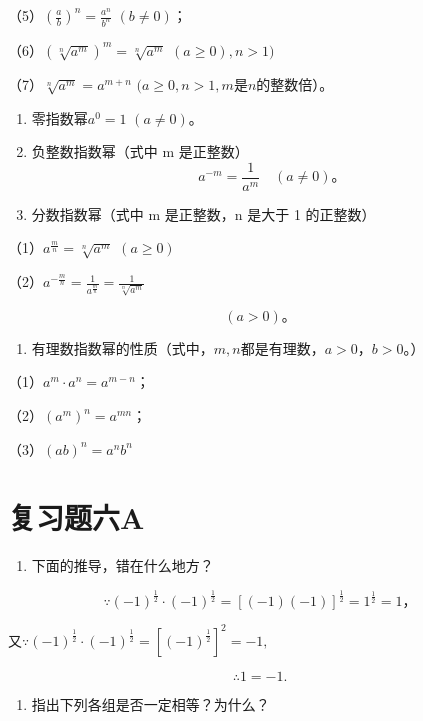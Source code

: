 （5）\(\left(\frac{a}{b}\right)^n = \frac{a^n}{b^n}\) \((b \neq 0)\)；

（6）\((\sqrt[n]{a^m})^m = \sqrt[n]{a^m}\) \((a\geqslant 0),n > 1)\)

（7）\(\sqrt[n]{a^m} = a^{m + n}\) \((a\geqslant 0,n > 1,m\)是\(n\)的整数倍）。

\begin{enumerate}[start=2]
\item
  零指数幂\(a^0 = 1\) \((a \neq 0)\)。
\item
  负整数指数幂（式中 m 是正整数）
\[
a ^ {- m} = \frac{1}{a ^ {m}} \quad (a \neq 0)\text{。}
\]
\item
  分数指数幂（式中 m 是正整数，n 是大于 1 的正整数）
\end{enumerate}

（1）\(a^{\frac{m}{n}} = \sqrt[n]{a^m}\) \((a\geqslant 0)\)

（2）\(a^{-\frac{m}{n}} = \frac{1}{a^{\frac{m}{n}}} = \frac{1}{\sqrt[n]{a^m}}\)

\[
(a > 0)\text{。}
\]

\begin{enumerate}[start=5]
\item
  有理数指数幂的性质（式中，\(m, n\)都是有理数，\(a > 0\)，\(b > 0\)。）
\end{enumerate}

（1）\(a^{m} \cdot a^{n} = a^{m - n}\)；

（2）\((a^{m})^{n} = a^{mn}\)；

（3）\((ab)^{n} = a^{n}b^{n}\)

\section{复习题六A}

\begin{enumerate}
\item
  下面的推导，错在什么地方？
\end{enumerate}

\[
\because (- 1) ^ {\frac{1}{2}} \cdot (- 1) ^ {\frac{1}{2}} = [ (- 1) (- 1) ] ^ {\frac{1}{2}} = 1 ^ {\frac{1}{2}} = 1\text{，}
\]

又\(\because (-1)^{\frac{1}{2}}\cdot (-1)^{\frac{1}{2}} = [(-1)^{\frac{1}{2}}]^{2} = -1,\)

\[
\therefore 1 = - 1.
\]

\begin{enumerate}[start=2]
\item
  指出下列各组是否一定相等？为什么？
\end{enumerate}

